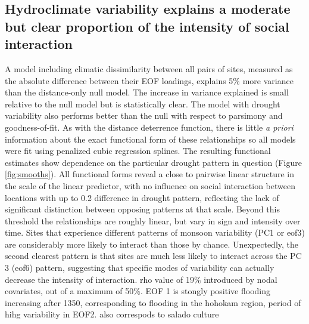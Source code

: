 \documentclass[11pt]{wlscirep}
\begin{document}



\subsection*{Hydroclimate variability explains a moderate but clear proportion of the intensity of social interaction}
A model including climatic dissimilarity between all pairs of sites, measured as the absolute difference between their EOF loadings, explains 5\% more variance than the distance-only null model. The increase in variance explained is small relative to the null model but is statistically clear. The model with drought variability also performs better than the null with respect to parsimony and goodness-of-fit. As with the distance deterrence function, there is little \textit{a priori} information about the exact functional form of these relationships so all models were fit using penalized cubic regression splines. The resulting functional estimates show dependence on the particular drought pattern in question (Figure \ref{fig:smooths}). All functional forms reveal a close to pairwise linear structure in the scale of the linear predictor, with no influence on social interaction between locations with up to 0.2 difference in drought pattern, reflecting the lack of significant distinction between opposing patterns at that scale. Beyond this threshold the relationships are roughly linear, but vary in sign and intensity over time. Sites that experience different patterns of monsoon variability (PC1 or eof3) are considerably more likely to interact than those by chance. Unexpectedly, the second clearest pattern is that sites are much less likely to interact across the PC 3 (eof6) pattern, suggesting that specific modes of variability can actually decrease the intensity of interaction. rho value of 19\% introduced by nodal covariates, out of a maximum of 50\%. EOF 1 is stongly positive flooding increasing after 1350, corresponding to flooding in the hohokam region, period of hihg variability in EOF2. also correspods to salado culture
\end{document}
